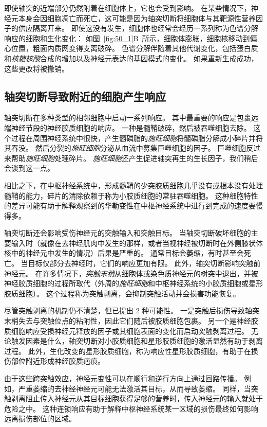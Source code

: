 即使轴突的近端部分仍然附着在细胞体上，它也会受到影响。
在某些情况下，神经元本身会因细胞凋亡而死亡，这可能是因为轴突切断将细胞体与其靶源性营养因子的供应隔离开来。
即使这没有发生，细胞体也经常会经历一系列称为色谱分解响应的细胞和生化变化：
如图~\ref{fig:50_1}B~所示，细胞体膨胀，细胞核移动到偏心位置，粗面内质网变得支离破碎。
色谱分解伴随着其他代谢变化，包括蛋白质和\textit{核糖核酸}合成的增加以及神经元表达的基因模式的变化。
如果重新生成成功，这些更改将被撤销。



\subsection{轴突切断导致附近的细胞产生响应}

轴突切断在多种类型的相邻细胞中启动一系列响应。
其中最重要的响应是包裹远端神经节段的神经胶质细胞的响应。
一种是髓鞘破碎，然后被吞噬细胞去除。
这个过程在周围神经系统中很快，产生髓磷脂的\textit{施旺细胞}将髓磷脂分解成小碎片并将其吞没。
然后分裂的\textit{施旺细胞}分泌从血流中募集巨噬细胞的因子。
巨噬细胞反过来帮助\textit{施旺细胞}处理碎片。
\textit{施旺细胞}还产生促进轴突再生的生长因子，我们稍后会谈到这一点。


相比之下，在中枢神经系统中，形成髓鞘的少突胶质细胞几乎没有或根本没有处理髓鞘的能力，碎片的清除依赖于称为小胶质细胞的常驻吞噬细胞。
这种细胞特性的差异可能有助于解释观察到的华勒变性在中枢神经系统中进行到完成的速度要慢得多。


轴突切断还会影响受伤神经元的突触输入和突触目标。
当轴突切断破坏细胞的主要输入时（就像在去神经肌肉中发生的那样，或者当视神经被切断时在外侧膝状体核中的神经元中发生的情况）后果是严重的。
通常目标会萎缩，有时甚至会死亡。
当目标仅部分去神经时，它们的响应更加有限。
此外，轴突切断影响突触前神经元。
在许多情况下，\textit{突触末稍}从细胞体或染色质神经元的树突中退出，并被神经胶质细胞的过程所取代（外周的\textit{施旺细胞}和中枢神经系统的小胶质细胞或星形胶质细胞）。
这个过程称为突触剥离，会抑制突触活动并会损害功能恢复。


尽管突触剥离的机制仍不清楚，但已提出 2 种可能性。
一是突触后损伤导致轴突末梢失去与突触位点的粘附性，因此它们随后被胶质细胞包裹。
另一个是神经胶质细胞响应受损神经元释放的因子或其细胞表面的变化而启动突触剥离过程。
无论触发因素是什么，轴突切断对小胶质细胞和星形胶质细胞的激活显然有助于剥离过程。
此外，生化改变的星形胶质细胞，称为响应性星形胶质细胞，有助于在损伤部位附近形成神经胶质疤痕。


由于这些跨突触效应，神经元变性可以在顺行和逆行方向上通过回路传播。
例如，严重萎缩的去神经神经元可能无法激活其目标，从而导致萎缩。
同样，当突触剥离阻止传入神经元从其目标细胞获得足够的营养时，传入神经元的输入就处于危险之中。
这种连锁响应有助于解释中枢神经系统某一区域的损伤最终如何影响远离损伤部位的区域。



